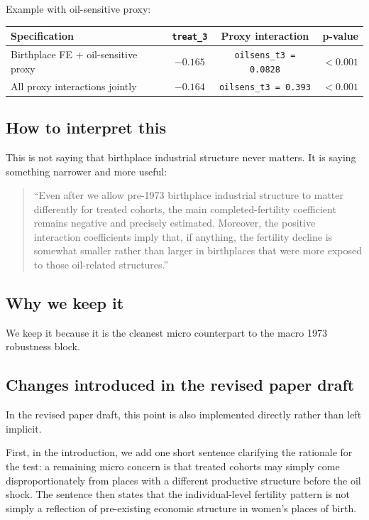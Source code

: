 \documentclass[11pt]{article}
\begin{document}
Example with oil-sensitive proxy:

\begin{center}
\begin{tabular}{lccc}
\toprule
Specification & \texttt{treat\_3} & Proxy interaction & p-value \\
\midrule
Birthplace FE + oil-sensitive proxy & $-0.165$ & \texttt{oilsens\_t3 = 0.0828} & $< 0.001$ \\
All proxy interactions jointly & $-0.164$ & \texttt{oilsens\_t3 = 0.393} & $< 0.001$ \\
\bottomrule
\end{tabular}
\end{center}

\subsection*{How to interpret this}

This is not saying that birthplace industrial structure never matters. It is saying something narrower and more useful:

\begin{quote}
``Even after we allow pre-1973 birthplace industrial structure to matter differently for treated cohorts, the main completed-fertility coefficient remains negative and precisely estimated. Moreover, the positive interaction coefficients imply that, if anything, the fertility decline is somewhat smaller rather than larger in birthplaces that were more exposed to those oil-related structures.''
\end{quote}

\subsection*{Why we keep it}

We keep it because it is the cleanest micro counterpart to the macro 1973 robustness block.

\subsection*{Changes introduced in the revised paper draft}

In the revised paper draft, this point is also implemented directly rather than left implicit.

First, in the introduction, we add one short sentence clarifying the rationale for the test: a remaining micro concern is that treated cohorts may simply come disproportionately from places with a different productive structure before the oil shock. The sentence then states that the individual-level fertility pattern is not simply a reflection of pre-existing economic structure in women's places of birth.
\end{document}
